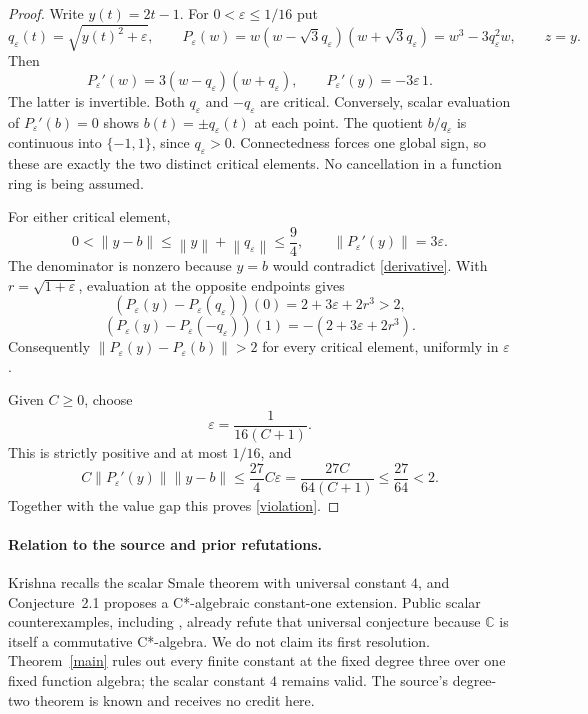 \documentclass[11pt]{article}
\newcommand{\C}{\mathbb C}
\newcommand{\norm}[1]{\left\lVert#1\right\rVert}
\begin{document}
\begin{proof}
Write $y(t)=2t-1$. For $0<\varepsilon\leq1/16$ put
\[
 q_\varepsilon(t)=\sqrt{y(t)^2+\varepsilon},\qquad
 P_\varepsilon(w)=w(w-\sqrt3 q_\varepsilon)(w+\sqrt3 q_\varepsilon)
                 =w^3-3q_\varepsilon^2w,\qquad z=y.
\]
Then
\begin{equation}\label{derivative}
 P_\varepsilon'(w)=3(w-q_\varepsilon)(w+q_\varepsilon),\qquad
 P_\varepsilon'(y)=-3\varepsilon\,1.
\end{equation}
The latter is invertible. Both $q_\varepsilon$ and $-q_\varepsilon$ are
critical. Conversely, scalar evaluation of $P_\varepsilon'(b)=0$ shows
$b(t)=\pm q_\varepsilon(t)$ at each point. The quotient
$b/q_\varepsilon$ is continuous into $\{-1,1\}$, since $q_\varepsilon>0$.
Connectedness forces one global sign, so these are exactly the two distinct
critical elements. No cancellation in a function ring is being assumed.

For either critical element,
\begin{equation}\label{uniform}
 0<\norm{y-b}\leq\norm y+\norm{q_\varepsilon}\leq\frac94,
 \qquad \norm{P_\varepsilon'(y)}=3\varepsilon.
\end{equation}
The denominator is nonzero because $y=b$ would contradict
\eqref{derivative}. With $r=\sqrt{1+\varepsilon}$, evaluation at the
opposite endpoints gives
\[
 (P_\varepsilon(y)-P_\varepsilon(q_\varepsilon))(0)
       =2+3\varepsilon+2r^3>2,
\]
\[
 (P_\varepsilon(y)-P_\varepsilon(-q_\varepsilon))(1)
       =-(2+3\varepsilon+2r^3).
\]
Consequently $\norm{P_\varepsilon(y)-P_\varepsilon(b)}>2$ for every
critical element, uniformly in $\varepsilon$.

Given $C\geq0$, choose
\begin{equation}\label{choice}
 \varepsilon=\frac1{16(C+1)}.
\end{equation}
This is strictly positive and at most $1/16$, and
\[
 C\norm{P_\varepsilon'(y)}\norm{y-b}
 \leq\frac{27}{4}C\varepsilon
 =\frac{27C}{64(C+1)}\leq\frac{27}{64}<2.
\]
Together with the value gap this proves \eqref{violation}.
\end{proof}

\paragraph{Relation to the source and prior refutations.}
Krishna \cite[Theorems~1.1--1.2]{Krishna} recalls the scalar Smale theorem
with universal constant $4$, and Conjecture~2.1 proposes a C*-algebraic
constant-one extension. Public scalar counterexamples, including
\cite[Theorem~1.3]{JatarNg}, already refute that universal conjecture because
$\C$ is itself a commutative C*-algebra. We do not claim its first resolution.
Theorem~\ref{main} rules out every finite constant at the fixed degree three
over one fixed function algebra; the scalar constant $4$ remains valid.
The source's degree-two theorem is known and receives no credit here.
\end{document}
